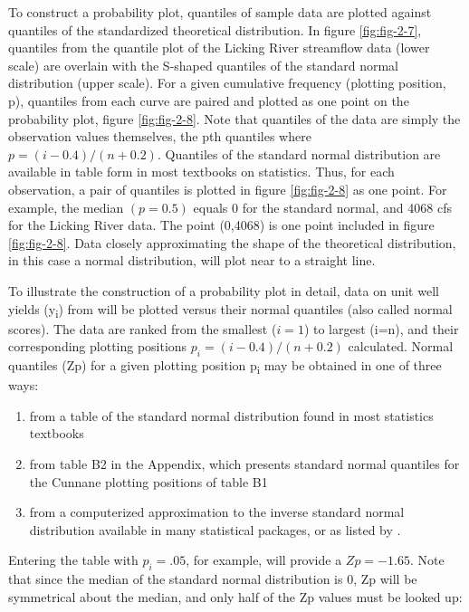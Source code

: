 \documentclass[]{book}
\providecommand{\tightlist}{%
  \setlength{\itemsep}{0pt}\setlength{\parskip}{0pt}}
\begin{document}
To construct a probability plot, quantiles of sample data are plotted against quantiles of the standardized theoretical distribution. In figure \ref{fig:fig-2-7}, quantiles from the quantile plot of the Licking River streamflow data (lower scale) are overlain with the S-shaped quantiles of the standard normal distribution (upper scale). For a given cumulative frequency (plotting position, p), quantiles from each curve are paired and plotted as one point on the probability plot, figure \ref{fig:fig-2-8}. Note that quantiles of the data are simply the observation values themselves, the pth quantiles where \(p = (i − 0.4)/(n + 0.2)\). Quantiles of the standard normal distribution are available in table form in most textbooks on statistics. Thus, for each observation, a pair of quantiles is plotted in figure \ref{fig:fig-2-8} as one point. For example, the median \((p = 0.5)\) equals 0 for the standard normal, and 4068 cfs for the Licking River data. The point (0,4068) is one point included in figure \ref{fig:fig-2-8}. Data closely approximating the shape of the theoretical distribution, in this case a normal distribution, will plot near to a straight line.

To illustrate the construction of a probability plot in detail, data on unit well yields (y\textsubscript{i}) from \citet{wright_effects_1985} will be plotted versus their normal quantiles (also called normal scores). The data are ranked from the smallest (\(i = 1\)) to largest (i=n), and their corresponding plotting positions \(p_{i} = (i − 0.4)/(n + 0.2)\) calculated. Normal quantiles (Zp) for a given plotting position p\textsubscript{i} may be obtained in one of three ways:

\begin{enumerate}
\def\labelenumi{\alph{enumi}.}
\tightlist
\item
  from a table of the standard normal distribution found in most statistics textbooks
\item
  from table B2 in the Appendix, which presents standard normal quantiles for the Cunnane plotting positions of table B1
\item
  from a computerized approximation to the inverse standard normal distribution available in many statistical packages, or as listed by \citet{zelen_probability_1964}.
\end{enumerate}

Entering the table with \(p_{i} = .05\), for example, will provide a \(Zp = − 1.65\). Note that since the median of the standard normal distribution is 0, Zp will be symmetrical about the median, and only half of the Zp values must be looked up:
\end{document}
